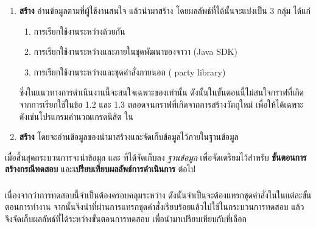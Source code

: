 \begin{enumerate}
    \item {\bf สร้าง{\scg}} อ่านข้อมูล{\CUT}ตามที่ผู้ใช้งานสนใจ แล้วนำมาสร้าง{\scg} โดยผลลัพธ์ที่ได้นั้นจะแบ่งเป็น 3 กลุ่ม ได้แก่
        \begin{enumerate}
            \item การเรียกใช้งานระหว่าง{\CUT}ด้วยกัน \label{ord:scgcut} 
            \item การเรียกใช้งานระหว่าง{\CUT}และ{\class}ภายในชุดพัฒนาของจาวา (Java SDK) \label{ord:scgjdk} 
            \item การเรียกใช้งานระหว่าง{\CUT}และชุดคำสั่งภายนอก ( party library) \label{ord:scg3rd} 
        \end{enumerate}
        ซึ่งในแนวทางการดำเนินงานนี้จะสนใจเฉพาะ{\scg}ของ{\CUT}เท่านั้น ดังนั้นในขั้นตอนนี้ไม่สนใจกราฟที่เกิดจากการเรียกใช้ในข้อ 1.2
        และ 1.3 ตลอดจนกราฟที่เกิดจากการสร้างวัตถุใหม่ เพื่อให้ได้{\scg}เฉพาะ{\CUT} ดังเช่น{\scg}โปรแกรมคํานวณเกรดนิสิต ใน

    \item {\bf สร้าง{\cfg}} โดยจะอ่านข้อมูลของ{\CUT}นำมาสร้าง{\cfg}และจัดเก็บข้อมูลไว้ภายในฐานข้อมูล
\end{enumerate}

เมื่อสิ้นสุดกระบวนการจะนำข้อมูล{\bf {\scg}} และ{\bf {\cfg}} ที่ได้จัดเก็บลง {\it ฐานข้อมูล} เพื่อจัดเตรียมไว้สำหรับ 
{\bf ขั้นตอนการสร้างกรณีทดสอบ} และ{\bf เปรียบเทียบผลลัพธ์การดำเนินการ} ต่อไป

\subsubsection{\sourcecodeInstrumention}
\label{sec:sub:sub:srcInstrument}

เนื่องจากว่าการทดสอบนี้จำเป็นต้องครอบคลุม{\Path}ระหว่าง{\CUT} ดังนั้นจำเป็นจะต้องแทรกชุดคำสั่งใน{\sourcecode}ในแต่ละขั้นตอนการทำงาน 
จากนั้นจึงนำ{\sourcecode}ที่ผ่านการแทรกชุดคำสั่งเรียบร้อยแล้วไปใช้ในกระบวนการทดสอบ 
แล้วจึงจัดเก็บผลลัพธ์ที่ได้ระหว่างขั้นตอนการทดสอบ เพื่อนำมาเปรียบเทียบกับ{\TestPath}ที่เลือก

%     
% 

